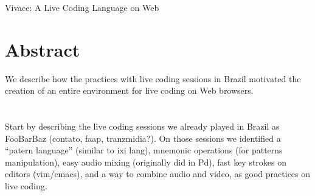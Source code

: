 \documentclass[letterpaper, 12pt]{article}
\begin{document}
{\cmjTitle Vivace: A Live Coding Language on Web}
\vspace*{24pt}



\vspace*{24pt}
\vspace*{24pt}

\section*{Abstract}

We describe how the practices with live coding sessions in Brazil
motivated the creation of an entire environment for live coding on Web
browsers.

\section*{}


Start by describing the live coding sessions we already played in
Brazil as FooBarBaz (contato, faap, tranzmidia?). On those sessions we
identified a ``patern language'' (similar to ixi lang), mnemonic
operations (for patterns manipulation), easy audio mixing (originally
did in Pd), fast key strokes on editors (vim/emacs), and a way to
combine audio and video, as good practices on live coding.
\end{document}
